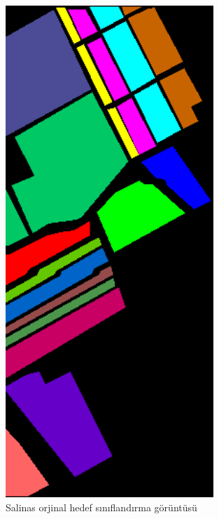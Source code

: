 \begin{figure}[!ht]
    \begin{minipage}[c]{0.4\linewidth}
        \includegraphics[width=0.7\textwidth]{Figures/SA_ground_.png}
        \caption{Salinas orjinal hedef sınıflandırma görüntüsü }
        \end{minipage}
    \hfill
        \begin{minipage}[c]{0.4\linewidth}

\end{minipage}
\end{figure}
